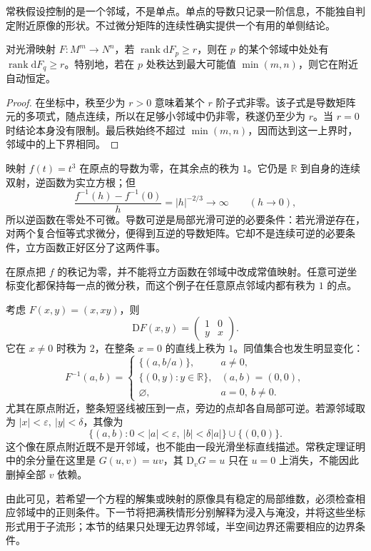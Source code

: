 常秩假设控制的是一个邻域，不是单点。单点的导数只记录一阶信息，不能独自判定附近原像的形状。不过微分矩阵的连续性确实提供一个有用的单侧结论。

\begin{proposition}
	\label{g1:prop:rank-lower-bound}
	对光滑映射 \(F:M^m\to N^n\)，若 \(\operatorname{rank}\mathrm{d}F_p\geq r\)，则在 \(p\) 的某个邻域中处处有 \(\operatorname{rank}\mathrm{d}F_q\geq r\)。特别地，若在 \(p\) 处秩达到最大可能值 \(\min(m,n)\)，则它在附近自动恒定。
\end{proposition}
\begin{proof}
	在坐标中，秩至少为 \(r>0\) 意味着某个 \(r\) 阶子式非零。该子式是导数矩阵元的多项式，随点连续，所以在足够小邻域中仍非零，秩遂仍至少为 \(r\)。当 \(r=0\) 时结论本身没有限制。最后秩始终不超过 \(\min(m,n)\)，因而达到这一上界时，邻域中的上下界相同。
\end{proof}

\begin{example}
	\label{g1:exm:cubic-rank-change}
	映射 \(f(t)=t^3\) 在原点的导数为零，在其余点的秩为 \(1\)。它仍是 \(\mathbb R\) 到自身的连续双射，逆函数为实立方根；但
	\[
		\frac{f^{-1}(h)-f^{-1}(0)}h=|h|^{-2/3}\longrightarrow\infty
		\qquad(h\to0),
	\]
	所以逆函数在零处不可微。导数可逆是局部光滑可逆的必要条件：若光滑逆存在，对两个复合恒等式求微分，便得到互逆的导数矩阵。它却不是连续可逆的必要条件，立方函数正好区分了这两件事。
\end{example}

在原点把 \(f\) 的秩记为零，并不能将立方函数在邻域中改成常值映射。任意可逆坐标变化都保持每一点的微分秩，而这个例子在任意原点邻域内都有秩为 \(1\) 的点。

\begin{example}
	\label{g1:exm:rank-changing-product}
	考虑 \(F(x,y)=(x,xy)\)，则
	\[
		\mathrm{D}F(x,y)=\begin{pmatrix}1&0\\y&x\end{pmatrix}.
	\]
	它在 \(x\ne0\) 时秩为 \(2\)，在整条 \(x=0\) 的直线上秩为 \(1\)。同值集合也发生明显变化：
	\[
		F^{-1}(a,b)=
		\begin{cases}
			\{(a,b/a)\},&a\ne0,\\
			\{(0,y):y\in\mathbb R\},&(a,b)=(0,0),\\
			\varnothing,&a=0,\ b\ne0.
		\end{cases}
	\]
	尤其在原点附近，整条短竖线被压到一点，旁边的点却各自局部可逆。若源邻域取为 \(|x|<\varepsilon,\ |y|<\delta\)，其像为
	\[
		\{(a,b):0<|a|<\varepsilon,\ |b|<\delta|a|\}\cup\{(0,0)\}.
	\]
	这个像在原点附近既不是开邻域，也不能由一段光滑坐标直线描述。常秩定理证明中的余分量在这里是 \(G(u,v)=uv\)，其 \(\mathrm{D}_vG=u\) 只在 \(u=0\) 上消失，不能因此删掉全部 \(v\) 依赖。
\end{example}

由此可见，若希望一个方程的解集或映射的原像具有稳定的局部维数，必须检查相应邻域中的正则条件。下一节将把满秩情形分别解释为浸入与淹没，并将这些坐标形式用于子流形；本节的结果只处理无边界邻域，半空间边界还需要相应的边界条件。

